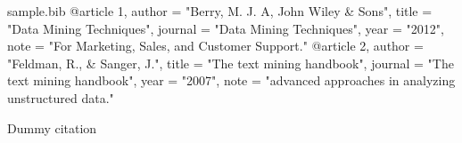 \documentclass{article}
\begin{document}
\begin{filecontents}{sample.bib}
@article {1,
    author  = "Berry, M. J. A, John Wiley \& Sons",
    title   = "Data Mining Techniques",
    journal = "Data Mining Techniques",
    year    = "2012",
    note    = "For Marketing, Sales, and Customer Support."
}
@article {2,
    author  = "Feldman, R., \& Sanger, J.",
    title   = "The text mining handbook",
    journal = "The text mining handbook",
    year    = "2007",
    note    = "advanced approaches in analyzing unstructured data."
}
\end{filecontents}
Dummy citation \cite{article, 1, 2}

\end{document}

